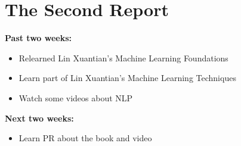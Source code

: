 \section{The Second Report}\label{sec-intro}
\textbf{Past two weeks:}
\begin{itemize}
	\item Relearned Lin Xuantian's Machine Learning Foundations
	\item Learn part of Lin Xuantian's Machine Learning Techniques
	\item Watch some videos about NLP
\end{itemize}
\textbf{Next two weeks:}
\begin{itemize}
	\item Learn PR about the book and video
\end{itemize}



%
%



%
%
%
%
%



%
%
%


